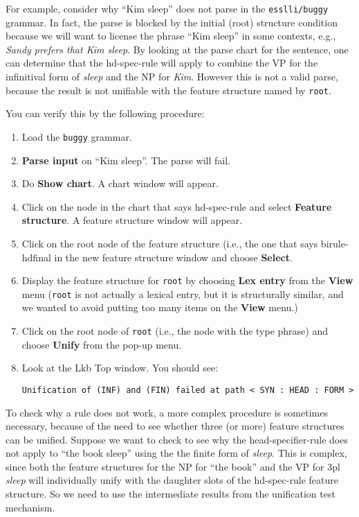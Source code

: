 \documentclass[12pt]{report}
\newcommand{\filename}[1]{{\tt #1}}
\newcommand{\lkbmenucommand}{\bf}
\begin{document}
For example, consider why ``Kim sleep'' does not parse in the 
\filename{esslli/buggy}
grammar.  
In fact, the parse is blocked by the initial (root) structure condition
because we will want to license the
phrase ``Kim sleep'' in some contexts, e.g., 
{\it Sandy prefers that Kim sleep}.
By looking at the 
parse chart for the sentence, one can determine that
the hd-spec-rule will apply to combine the VP for
the infinitival form of {\it sleep} and the NP for {\it Kim}.
However this is not a valid parse, because the result is not unifiable with the
feature structure named by {\tt root}.

You can verify this by the following procedure:
\begin{enumerate}
\item Load the \filename{buggy} grammar.
\item {\lkbmenucommand Parse input} on ``Kim sleep''.  The parse will fail.
\item Do {\lkbmenucommand Show chart}.  A chart window will appear.
\item Click on the node in the chart that says hd-spec-rule and 
select {\lkbmenucommand Feature structure}. A feature structure window will
appear.
\item 
Click on the root node of the feature structure (i.e., the one
that says {\type birule-hdfinal} in the 
new feature structure
window and 
choose {\lkbmenucommand Select}.
\item Display the feature structure for {\tt root} by choosing
{\lkbmenucommand Lex entry} from the {\lkbmenucommand View} menu ({\tt root} is not actually a
lexical entry, but it is structurally similar, and we wanted to avoid putting
too many items on the {\lkbmenucommand View} menu.)
\item Click on the root node of {\tt root} (i.e., the node
with the type {\type phrase}) and choose {\lkbmenucommand Unify} from the pop-up menu.
\item Look at the Lkb Top window.  You should see:
\begin{verbatim}
Unification of (INF) and (FIN) failed at path < SYN : HEAD : FORM >
\end{verbatim}
\end{enumerate}

To check why a rule does not work, a more complex
procedure is sometimes necessary, because of the need to see whether
three (or more) feature structures can be unified.  
Suppose we want to check to see why the head-specifier-rule
does not apply to ``the book sleep'' using the
the finite form of {\it sleep}. This is 
complex, since both the feature structures for the NP for ``the book'' and
the VP for 3pl {\it sleep} will individually unify with the
daughter slots of the hd-spec-rule feature structure.
So we need to use the intermediate results 
from the unification test mechanism.
\end{document}
